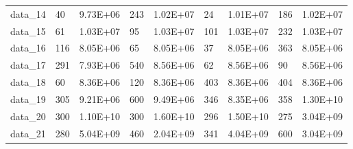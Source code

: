 \begin{table}[!h]
\begin{tabular}{lllllllll}
data\_14 & 40                & 9.73E+06             & 243                                      & 1.02E+07                                     & 24                                          & 1.01E+07                                        & 186                                      & 1.02E+07                                     \\
data\_15 & 61                & 1.03E+07             & 95                                       & 1.03E+07                                     & 101                                         & 1.03E+07                                        & 232                                      & 1.03E+07                                     \\
data\_16 & 116               & 8.05E+06             & 65                                       & 8.05E+06                                     & 37                                          & 8.05E+06                                        & 363                                      & 8.05E+06                                     \\
data\_17 & 291               & 7.93E+06             & 540                                      & 8.56E+06                                     & 62                                          & 8.56E+06                                        & 90                                       & 8.56E+06                                     \\
data\_18 & 60                & 8.36E+06             & 120                                      & 8.36E+06                                     & 403                                         & 8.36E+06                                        & 404                                      & 8.36E+06                                     \\
data\_19 & 305               & 9.21E+06             & 600                                      & 9.49E+06                                     & 346                                         & 8.35E+06                                        & 358                                      & 1.30E+10                                     \\
data\_20 & 300               & 1.10E+10             & 300                                      & 1.60E+10                                     & 296                                         & 1.50E+10                                        & 275                                      & 3.04E+09                                     \\
data\_21 & 280               & 5.04E+09             & 460                                      & 2.04E+09                                     & 341                                         & 4.04E+09                                        & 600                                      & 3.04E+09                                     \\

\end{tabular}
\end{table}
